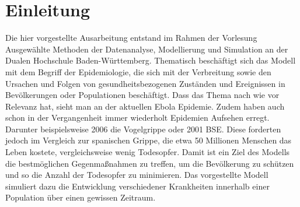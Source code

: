 \section*{Einleitung}

Die hier vorgestellte Ausarbeitung entstand im Rahmen der Vorlesung \glqq Ausgewählte Methoden der Datenanalyse, Modellierung und Simulation\grqq\; an der Dualen Hochschule Baden-Württemberg. Thematisch beschäftigt sich das Modell mit dem Begriff der Epidemiologie, die sich mit der Verbreitung sowie den Ursachen und Folgen von gesundheitsbezogenen Zuständen und Ereignissen in Bevölkerungen oder Populationen beschäftigt. %
Dass das Thema nach wie vor Relevanz hat, sieht man an der aktuellen Ebola Epidemie. Zudem haben auch schon in der Vergangenheit immer wiederholt Epidemien Aufsehen erregt. Darunter beispielsweise 2006 die Vogelgrippe %
oder 2001 BSE. Diese forderten jedoch im Vergleich zur spanischen Grippe, die etwa 50 Millionen Menschen das Leben kostete, vergleichsweise wenig Todesopfer.
Damit ist ein Ziel des Modells die bestmöglichen Gegenmaßnahmen zu treffen, um die Bevölkerung zu schützen und so die Anzahl der Todesopfer zu minimieren.
Das vorgestellte Modell simuliert dazu die Entwicklung verschiedener Krankheiten innerhalb einer Population über einen gewissen Zeitraum. 



%
%
